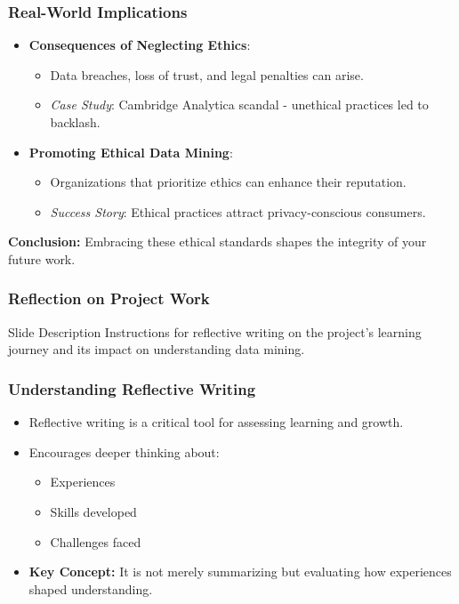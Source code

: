 \documentclass[aspectratio=169]{beamer}
\begin{document}
\begin{frame}[fragile]
    \frametitle{Real-World Implications}
    \begin{itemize}
        \item \textbf{Consequences of Neglecting Ethics}:
        \begin{itemize}
            \item Data breaches, loss of trust, and legal penalties can arise.
            \item \emph{Case Study}: Cambridge Analytica scandal - unethical practices led to backlash.
        \end{itemize}

        \item \textbf{Promoting Ethical Data Mining}:
        \begin{itemize}
            \item Organizations that prioritize ethics can enhance their reputation.
            \item \emph{Success Story}: Ethical practices attract privacy-conscious consumers.
        \end{itemize}
    \end{itemize}

    \textbf{Conclusion:} Embracing these ethical standards shapes the integrity of your future work.
\end{frame}

\begin{frame}[fragile]
    \frametitle{Reflection on Project Work}
    \begin{block}{Slide Description}
        Instructions for reflective writing on the project's learning journey and its impact on understanding data mining.
    \end{block}
\end{frame}

\begin{frame}[fragile]
    \frametitle{Understanding Reflective Writing}
    \begin{itemize}
        \item Reflective writing is a critical tool for assessing learning and growth.
        \item Encourages deeper thinking about:
        \begin{itemize}
            \item Experiences
            \item Skills developed
            \item Challenges faced
        \end{itemize}
        \item \textbf{Key Concept:} It is not merely summarizing but evaluating how experiences shaped understanding.
    \end{itemize}
\end{frame}
\end{document}
